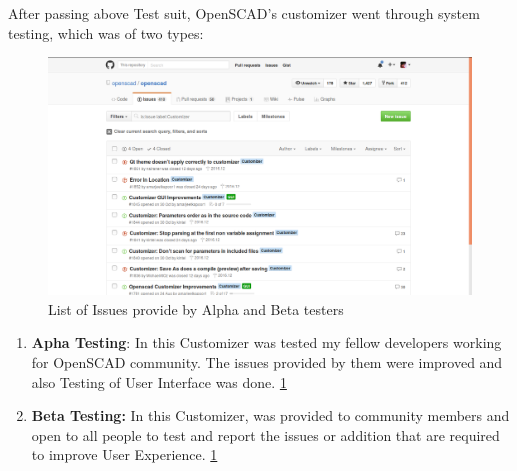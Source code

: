 After passing above Test suit, OpenSCAD's customizer went through system testing, which was of two types:
\begin{figure}
\centering
\includegraphics[width=\linewidth]{images/Issues}
\caption{List of Issues provide by Alpha and Beta testers}
\label{fig:Issues}
\end{figure}

\begin{enumerate}
    \item \textbf{Apha Testing}: In this Customizer was tested my fellow developers working for OpenSCAD community. The issues provided by them were improved and also Testing of User Interface was done. \ref{fig:Issues}
   
    \item \textbf{Beta Testing:} In this Customizer, was provided to community members and open to all people to test and report the issues or addition that are required to improve User Experience. \ref{fig:Issues}
   
\end{enumerate}

